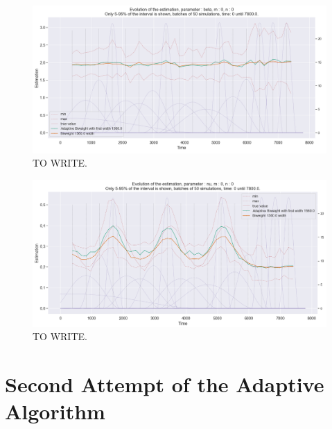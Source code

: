 \begin{figure}
\centering
\includegraphics[width = 0.90 \textwidth]{../imag/chap3/4/N.png}
\caption{TO WRITE.}
\label{fig:first_estimate_4_beta}
\end{figure}

\begin{figure}
\centering
\includegraphics[width = 0.90 \textwidth]{../imag/chap3/4/O.png}
\caption{TO WRITE.}
\label{fig:first_estimate_4_nu}
\end{figure}






































\newpage
\section{Second Attempt of the Adaptive Algorithm}



